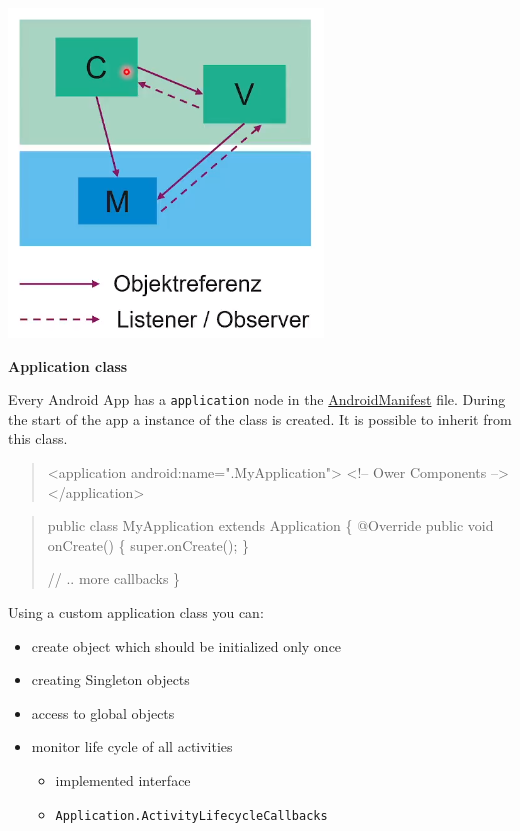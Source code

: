 \documentclass[11pt,twoside,landscape]{article}
\begin{document}
\begin{multicols}{3}
\begin{center}
\includegraphics[width=.9\linewidth]{img/mvc.png}
\end{center}


\textbf{Application class}

Every Android App has a \texttt{application} node in the \href{../../../roam/20210921175054-androidmanifest.org}{AndroidManifest} file.
During the start of the app a instance of the class is created.
It is possible to inherit from this class.

\begin{quote}
<application android:name=".MyApplication">
  <!-- Ower Components -->
</application>
\end{quote}

\begin{quote}
public class MyApplication extends Application \{
    @Override
    public void onCreate() \{
	super.onCreate();
    \}

    // .. more callbacks
\}
\end{quote}

Using a custom application class you can:
\begin{itemize}
\item create object which should be initialized only once
\item creating Singleton objects
\item access to global objects
\item monitor life cycle of all activities
\begin{itemize}
\item implemented interface
\item \texttt{Application.ActivityLifecycleCallbacks}
\end{itemize}
\end{itemize}


\end{multicols}
\end{document}
